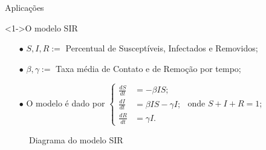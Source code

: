 \documentclass{beamer}
\theoremstyle{plain}
\theoremstyle{definition}
\begin{document}
\begin{frame}{Aplicações}
     
    \begin{exampleblock}
        <1->{O modelo SIR}
        \small

        \begin{itemize}
            \item [$\bullet$] $S,I,R :=$ Percentual de Susceptíveis, Infectados e Removidos;
            \item [$\bullet$] $\beta, \gamma := $ Taxa média de Contato e de Remoção por tempo;
            \item [$\bullet$] O modelo é dado por
                $ 
                \begin{cases}
                    \frac{dS}{dt} &= -\beta I S; \\ 
                    \frac{dI}{dt} &= \beta I S - \gamma I;  \\
                    \frac{dR}{dt} &= \gamma I. 
                \end{cases}
                $ 
                onde $S + I + R = 1$;

        \end{itemize}


        \begin{figure}
            \begin{center}
            \end{center}
            \caption{Diagrama do modelo SIR}
        \end{figure}

    \end{exampleblock}

\end{frame}

\end{document}
